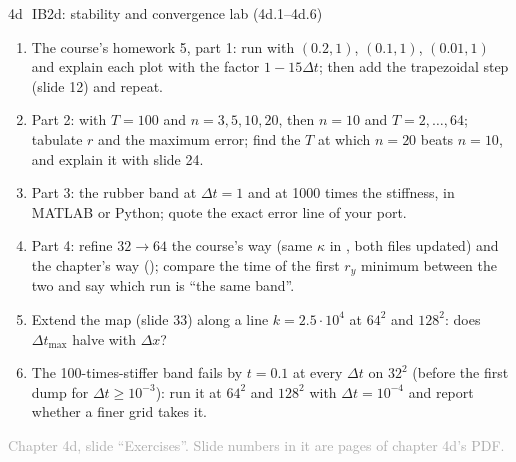 \documentclass[aspectratio=169,11pt]{beamer}
\newcommand{\sourcecredit}[1]{\vfill\begin{flushright}\tiny\textcolor{DarkGray}{#1}\end{flushright}}
\begin{document}
\begin{frame}{4d\,\textbullet\ IB2d: stability and convergence lab (4d.1--4d.6)}
\label{fr:c4dx1}
\small
\begin{enumerate}
  \item[4d.1] The course's homework 5, part 1: run  with $(0.2, 1)$, $(0.1, 1)$, $(0.01, 1)$ and explain each plot with the factor $1 - 15\Delta t$; then add the trapezoidal step (slide 12) and repeat.
  \item[4d.2] Part 2:  with $T = 100$ and $n = 3, 5, 10, 20$, then $n = 10$ and $T = 2, \ldots, 64$; tabulate $r$ and the maximum error; find the $T$ at which $n = 20$ beats $n = 10$, and explain it with slide 24.
  \item[4d.3] Part 3: the rubber band at $\Delta t = 1$ and at 1000 times the stiffness, in MATLAB or Python; quote the exact error line of your port.
  \item[4d.4] Part 4: refine $32 \to 64$ the course's way (same $\kappa$ in , both files updated) and the chapter's way (); compare the time of the first $r_y$ minimum between the two and say which run is ``the same band''.
  \item[4d.5] Extend the map (slide 33) along a line $k = 2.5 \cdot 10^4$ at $64^2$ and $128^2$: does $\Delta t_{\max}$ halve with $\Delta x$?
  \item[4d.6] The 100-times-stiffer band fails by $t = 0.1$ at every $\Delta t$ on $32^2$ (before the first dump for $\Delta t \ge 10^{-3}$): run it at $64^2$ and $128^2$ with $\Delta t = 10^{-4}$ and report whether a finer grid takes it.
\end{enumerate}
\sourcecredit{Chapter 4d, slide ``Exercises''. Slide numbers in it are pages of chapter 4d's PDF.}
\end{frame}
\end{document}
